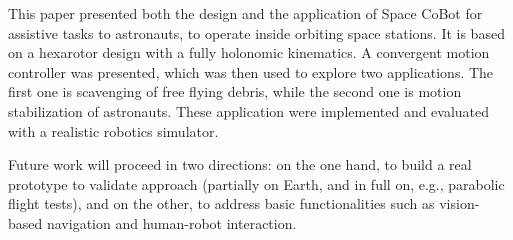 \documentclass{article}
\begin{document}
This paper presented both the design and the application of Space
CoBot for assistive tasks to astronauts, to operate inside
orbiting space stations. It is based on a hexarotor design with a
fully holonomic kinematics. A convergent motion controller was presented, which
was then used to explore two applications. The first one is
scavenging of free flying debris, while the second one is motion
stabilization of astronauts. These application were implemented and
evaluated with a realistic robotics simulator.

Future work will proceed in two directions: on the one hand, to build
a real prototype to validate approach (partially on Earth, and in full
on, e.g., parabolic flight tests), and on the other, to address basic
functionalities such as vision-based navigation and human-robot
interaction.




\end{document}
